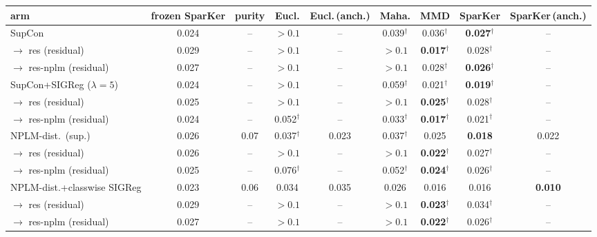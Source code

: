 \begin{table}[t]
\centering
\footnotesize
\begin{tabular}{lcccccccc}
\toprule
arm & frozen SparKer & purity & Eucl. & Eucl.\,(anch.) & Maha. & MMD & SparKer & SparKer\,(anch.) \\
\midrule
SupCon & 0.024 & -- & $>0.1$ & -- & 0.039$^\dagger$ & 0.036$^\dagger$ & \textbf{0.027$^\dagger$} & -- \\
\quad $\to$ res (residual) & 0.029 & -- & $>0.1$ & -- & $>0.1$ & \textbf{0.017$^\dagger$} & 0.028$^\dagger$ & -- \\
\quad $\to$ res-nplm (residual) & 0.027 & -- & $>0.1$ & -- & $>0.1$ & 0.028$^\dagger$ & \textbf{0.026$^\dagger$} & -- \\
\addlinespace
SupCon+SIGReg ($\lambda{=}5$) & 0.024 & -- & $>0.1$ & -- & 0.059$^\dagger$ & 0.021$^\dagger$ & \textbf{0.019$^\dagger$} & -- \\
\quad $\to$ res (residual) & 0.025 & -- & $>0.1$ & -- & $>0.1$ & \textbf{0.025$^\dagger$} & 0.028$^\dagger$ & -- \\
\quad $\to$ res-nplm (residual) & 0.024 & -- & 0.052$^\dagger$ & -- & 0.033$^\dagger$ & \textbf{0.017$^\dagger$} & 0.021$^\dagger$ & -- \\
\addlinespace
NPLM-dist.\ (sup.) & 0.026 & 0.07 & 0.037$^\dagger$ & 0.023 & 0.037$^\dagger$ & 0.025 & \textbf{0.018} & 0.022 \\
\quad $\to$ res (residual) & 0.026 & -- & $>0.1$ & -- & $>0.1$ & \textbf{0.022$^\dagger$} & 0.027$^\dagger$ & -- \\
\quad $\to$ res-nplm (residual) & 0.025 & -- & 0.076$^\dagger$ & -- & 0.052$^\dagger$ & \textbf{0.024$^\dagger$} & 0.026$^\dagger$ & -- \\
\addlinespace
NPLM-dist.+classwise SIGReg & 0.023 & 0.06 & 0.034 & 0.035 & 0.026 & 0.016 & 0.016 & \textbf{0.010} \\
\quad $\to$ res (residual) & 0.029 & -- & $>0.1$ & -- & $>0.1$ & \textbf{0.023$^\dagger$} & 0.034$^\dagger$ & -- \\
\quad $\to$ res-nplm (residual) & 0.027 & -- & $>0.1$ & -- & $>0.1$ & \textbf{0.022$^\dagger$} & 0.026$^\dagger$ & -- \\

\end{tabular}
\end{table}
